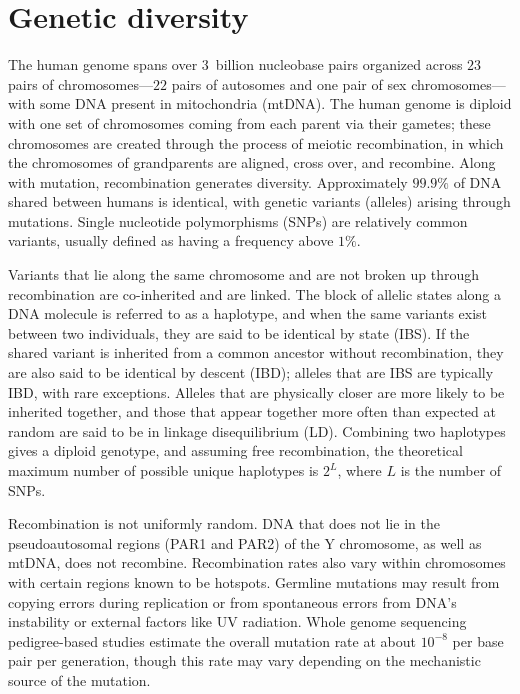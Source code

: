 
\section{Genetic diversity}

The human genome spans over $3$~billion nucleobase pairs organized across $23$ pairs of chromosomes---$22$ pairs of autosomes and one pair of sex chromosomes---with some DNA present in mitochondria (mtDNA). The human genome is diploid with one set of chromosomes coming from each parent via their gametes; these chromosomes are created through the process of meiotic recombination, in which the chromosomes of grandparents are aligned, cross over, and recombine. Along with mutation, recombination generates diversity. Approximately $99.9\%$ of DNA shared between humans is identical, with genetic variants (alleles) arising through mutations. Single nucleotide polymorphisms (SNPs) are relatively common variants, usually defined as having a frequency above $1\%$.

Variants that lie along the same chromosome and are not broken up through recombination are co-inherited and are linked. The block of allelic states along a DNA molecule is referred to as a haplotype, and when the same variants exist between two individuals, they are said to be identical by state (IBS). If the shared variant is inherited from a common ancestor without recombination, they are also said to be identical by descent (IBD); alleles that are IBS are typically IBD, with rare exceptions. Alleles that are physically closer are more likely to be inherited together, and those that appear together more often than expected at random are said to be in linkage disequilibrium (LD). Combining two haplotypes gives a diploid genotype, and assuming free recombination, the theoretical maximum number of possible unique haplotypes is $2^L$, where $L$ is the number of SNPs.

Recombination is not uniformly random. DNA that does not lie in the pseudoautosomal regions (PAR1 and PAR2) of the Y chromosome, as well as mtDNA, does not recombine\citep{jobling_human_2013}. Recombination rates also vary within chromosomes with certain regions known to be hotspots\citep{altemose_map_2017}. Germline mutations may result from copying errors during replication or from spontaneous errors from DNA’s instability or external factors like UV radiation. Whole genome sequencing pedigree-based studies estimate the overall mutation rate at about $10^{-8}$ per base pair per generation, though this rate may vary depending on the mechanistic source of the mutation\citep{segurel_determinants_2014}.

